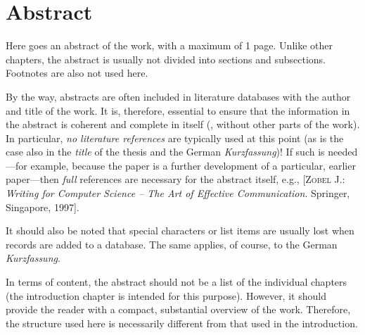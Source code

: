 \chapter{Abstract}

Here goes an abstract of the work, with a maximum of 1 page. Unlike other
chapters, the abstract is usually not divided into sections and subsections.
Footnotes are also not used here.

By the way, abstracts are often included in literature databases with the author
and title of the work. It is, therefore, essential to ensure that the
information in the abstract is coherent and complete in itself (\ie, without
other parts of the work). In particular, \emph{no literature references} are
typically used at this point (as is the case also in the \emph{title} of the
thesis and the German \emph{Kurzfassung})!
If such is needed---for example, because the paper is a further development of a
particular, earlier paper---then \emph{full} references are necessary for the
abstract itself, e.g., [\textsc{Zobel} J.: \textit{Writing for Computer Science
-- The Art of Effective Commu\-nica\-tion}. Springer, Singapore, 1997].

It should also be noted that special characters or list items are usually lost
when records are added to a database. The same applies, of course, to the German
\emph{Kurzfassung}.

In terms of content, the abstract should not be a list of the individual
chapters (the introduction chapter is intended for this purpose). However, it
should provide the reader with a compact, substantial overview of the work.
Therefore, the structure used here is necessarily different from that used in
the introduction.

